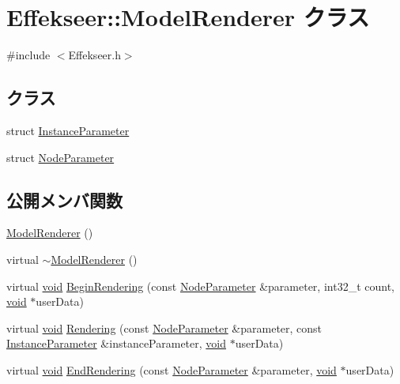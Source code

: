 \hypertarget{class_effekseer_1_1_model_renderer}{}\section{Effekseer\+:\+:Model\+Renderer クラス}
\label{class_effekseer_1_1_model_renderer}


{\ttfamily \#include $<$Effekseer.\+h$>$}

\subsection*{クラス}
\begin{DoxyCompactItemize}
\item 
struct \mbox{\hyperlink{struct_effekseer_1_1_model_renderer_1_1_instance_parameter}{Instance\+Parameter}}
\item 
struct \mbox{\hyperlink{struct_effekseer_1_1_model_renderer_1_1_node_parameter}{Node\+Parameter}}
\end{DoxyCompactItemize}
\subsection*{公開メンバ関数}
\begin{DoxyCompactItemize}
\item 
\mbox{\hyperlink{class_effekseer_1_1_model_renderer_a38117b38a7c94c9f49ff750f0818b09c}{Model\+Renderer}} ()
\item 
virtual \mbox{\hyperlink{class_effekseer_1_1_model_renderer_a4326573d817e6d24636fcbcfa6758738}{$\sim$\+Model\+Renderer}} ()
\item 
virtual \mbox{\hyperlink{namespace_effekseer_ab34c4088e512200cf4c2716f168deb56}{void}} \mbox{\hyperlink{class_effekseer_1_1_model_renderer_a9fcfb17ad8e41bacadc862cfef302490}{Begin\+Rendering}} (const \mbox{\hyperlink{struct_effekseer_1_1_model_renderer_1_1_node_parameter}{Node\+Parameter}} \&parameter, int32\+\_\+t count, \mbox{\hyperlink{namespace_effekseer_ab34c4088e512200cf4c2716f168deb56}{void}} $\ast$user\+Data)
\item 
virtual \mbox{\hyperlink{namespace_effekseer_ab34c4088e512200cf4c2716f168deb56}{void}} \mbox{\hyperlink{class_effekseer_1_1_model_renderer_af83aa3f24f7dc3e7681579f07d0f9086}{Rendering}} (const \mbox{\hyperlink{struct_effekseer_1_1_model_renderer_1_1_node_parameter}{Node\+Parameter}} \&parameter, const \mbox{\hyperlink{struct_effekseer_1_1_model_renderer_1_1_instance_parameter}{Instance\+Parameter}} \&instance\+Parameter, \mbox{\hyperlink{namespace_effekseer_ab34c4088e512200cf4c2716f168deb56}{void}} $\ast$user\+Data)
\item 
virtual \mbox{\hyperlink{namespace_effekseer_ab34c4088e512200cf4c2716f168deb56}{void}} \mbox{\hyperlink{class_effekseer_1_1_model_renderer_afabdeb2f4c342416a270c13840175082}{End\+Rendering}} (const \mbox{\hyperlink{struct_effekseer_1_1_model_renderer_1_1_node_parameter}{Node\+Parameter}} \&parameter, \mbox{\hyperlink{namespace_effekseer_ab34c4088e512200cf4c2716f168deb56}{void}} $\ast$user\+Data)
\end{DoxyCompactItemize}


